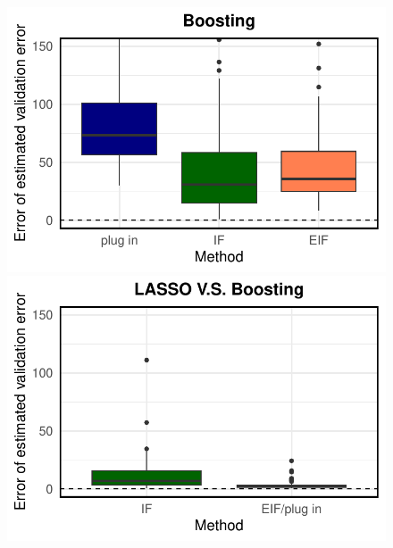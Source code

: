 \begin{figure}[ht]
\begin{minipage}{0.3\textwidth}
                \includegraphics[clip, trim = 0cm 0cm 0cm 0cm, width = \textwidth]{plot/ACIC_linear_propensity_nonlinear_HTE_estimator_error_Boosting.pdf}
        \end{minipage}
        \begin{minipage}{0.3\textwidth}
                \centering
                \includegraphics[clip, trim = 0cm 0cm 0cm 0cm, width = \textwidth]{plot/ACIC_linear_propensity_nonlinear_HTE_estimator_error_LASSO_V.S._Boosting.pdf}
        \end{minipage}        
        \begin{minipage}{0.3\textwidth}
                \centering

\end{minipage}
\end{figure}
